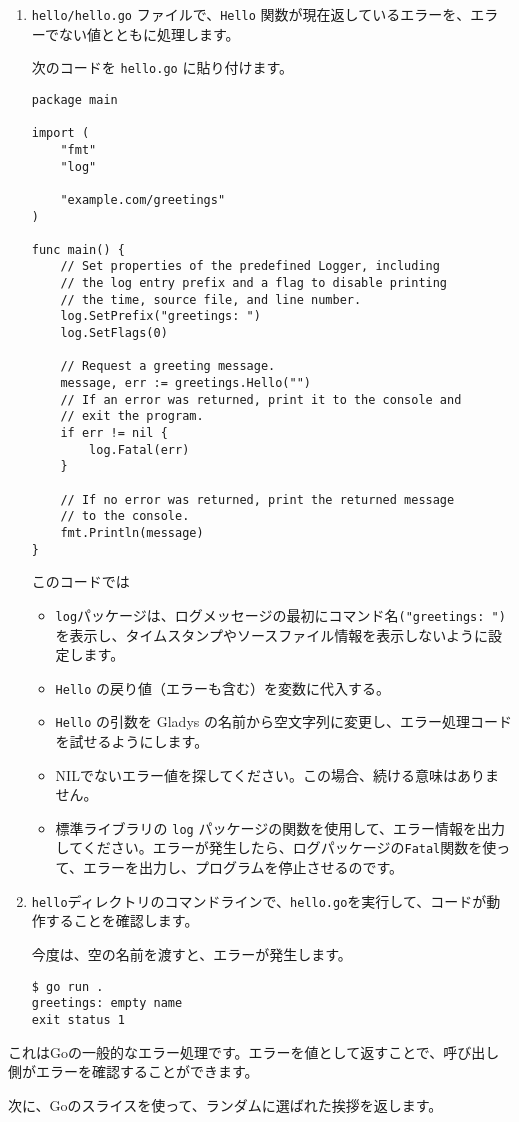 \begin{enumerate}
\item \texttt{hello/hello.go} ファイルで、\texttt{Hello} 関数が現在返しているエラーを、エラーでない値とともに処理します。

次のコードを \texttt{hello.go} に貼り付けます。

\begin{lstlisting}[numbers=none]
package main

import (
    "fmt"
    "log"

    "example.com/greetings"
)

func main() {
    // Set properties of the predefined Logger, including
    // the log entry prefix and a flag to disable printing
    // the time, source file, and line number.
    log.SetPrefix("greetings: ")
    log.SetFlags(0)

    // Request a greeting message.
    message, err := greetings.Hello("")
    // If an error was returned, print it to the console and
    // exit the program.
    if err != nil {
        log.Fatal(err)
    }

    // If no error was returned, print the returned message
    // to the console.
    fmt.Println(message)
}
\end{lstlisting}

このコードでは

\begin{itemize}
\item \texttt{log}パッケージは、ログメッセージの最初にコマンド名\texttt{("greetings: ")}を表示し、タイムスタンプやソースファイル情報を表示しないように設定します。
\item \texttt{Hello} の戻り値（エラーも含む）を変数に代入する。
\item \texttt{Hello} の引数を Gladys の名前から空文字列に変更し、エラー処理コードを試せるようにします。
\item NILでないエラー値を探してください。この場合、続ける意味はありません。
\item 標準ライブラリの \texttt{log} パッケージの関数を使用して、エラー情報を出力してください。エラーが発生したら、ログパッケージの\texttt{Fatal}関数を使って、エラーを出力し、プログラムを停止させるのです。
\end{itemize}

\item \texttt{hello}ディレクトリのコマンドラインで、\texttt{hello.go}を実行して、コードが動作することを確認します。

今度は、空の名前を渡すと、エラーが発生します。

\begin{lstlisting}[numbers=none]
$ go run .
greetings: empty name
exit status 1
\end{lstlisting}

\end{enumerate}


これはGoの一般的なエラー処理です。エラーを値として返すことで、呼び出し側がエラーを確認することができます。

次に、Goのスライスを使って、ランダムに選ばれた挨拶を返します。

